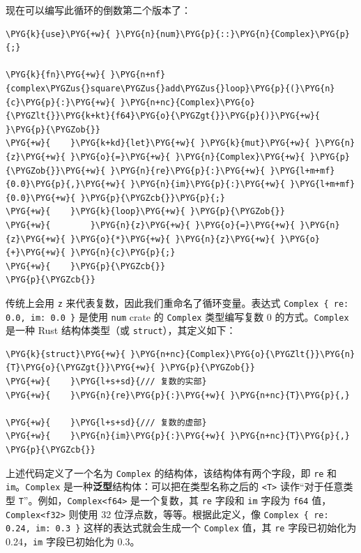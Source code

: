 现在可以编写此循环的倒数第二个版本了：

\begin{Verbatim}[commandchars=\\\{\},breaklines=true,breakanywhere=true,fontsize=\codefont,xleftmargin=17bp]
\PYG{k}{use}\PYG{+w}{ }\PYG{n}{num}\PYG{p}{::}\PYG{n}{Complex}\PYG{p}{;}

\PYG{k}{fn}\PYG{+w}{ }\PYG{n+nf}{complex\PYGZus{}square\PYGZus{}add\PYGZus{}loop}\PYG{p}{(}\PYG{n}{c}\PYG{p}{:}\PYG{+w}{ }\PYG{n+nc}{Complex}\PYG{o}{\PYGZlt{}}\PYG{k+kt}{f64}\PYG{o}{\PYGZgt{}}\PYG{p}{)}\PYG{+w}{ }\PYG{p}{\PYGZob{}}
\PYG{+w}{    }\PYG{k+kd}{let}\PYG{+w}{ }\PYG{k}{mut}\PYG{+w}{ }\PYG{n}{z}\PYG{+w}{ }\PYG{o}{=}\PYG{+w}{ }\PYG{n}{Complex}\PYG{+w}{ }\PYG{p}{\PYGZob{}}\PYG{+w}{ }\PYG{n}{re}\PYG{p}{:}\PYG{+w}{ }\PYG{l+m+mf}{0.0}\PYG{p}{,}\PYG{+w}{ }\PYG{n}{im}\PYG{p}{:}\PYG{+w}{ }\PYG{l+m+mf}{0.0}\PYG{+w}{ }\PYG{p}{\PYGZcb{}}\PYG{p}{;}
\PYG{+w}{    }\PYG{k}{loop}\PYG{+w}{ }\PYG{p}{\PYGZob{}}
\PYG{+w}{        }\PYG{n}{z}\PYG{+w}{ }\PYG{o}{=}\PYG{+w}{ }\PYG{n}{z}\PYG{+w}{ }\PYG{o}{*}\PYG{+w}{ }\PYG{n}{z}\PYG{+w}{ }\PYG{o}{+}\PYG{+w}{ }\PYG{n}{c}\PYG{p}{;}
\PYG{+w}{    }\PYG{p}{\PYGZcb{}}
\PYG{p}{\PYGZcb{}}
\end{Verbatim}

传统上会用 \texttt{z} 来代表复数，因此我们重命名了循环变量。表达式 \texttt{Complex \{ re: 0.0, im: 0.0 \}} 是使用 \texttt{num} crate 的 \texttt{Complex} 类型编写复数 0 的方式。\texttt{Complex} 是一种 Rust 结构体类型（或 \texttt{struct}），其定义如下：

\begin{Verbatim}[commandchars=\\\{\},breaklines=true,breakanywhere=true,fontsize=\codefont,xleftmargin=17bp]
\PYG{k}{struct}\PYG{+w}{ }\PYG{n+nc}{Complex}\PYG{o}{\PYGZlt{}}\PYG{n}{T}\PYG{o}{\PYGZgt{}}\PYG{+w}{ }\PYG{p}{\PYGZob{}}
\PYG{+w}{    }\PYG{l+s+sd}{/// 复数的实部}
\PYG{+w}{    }\PYG{n}{re}\PYG{p}{:}\PYG{+w}{ }\PYG{n+nc}{T}\PYG{p}{,}

\PYG{+w}{    }\PYG{l+s+sd}{/// 复数的虚部}
\PYG{+w}{    }\PYG{n}{im}\PYG{p}{:}\PYG{+w}{ }\PYG{n+nc}{T}\PYG{p}{,}
\PYG{p}{\PYGZcb{}}
\end{Verbatim}

上述代码定义了一个名为 \texttt{Complex} 的结构体，该结构体有两个字段，即 \texttt{re} 和 \texttt{im}。\texttt{Complex} 是一种\textbf{泛型}结构体：可以把在类型名称之后的 \texttt{<T>} 读作“对于任意类型 \texttt{T}”。例如，\texttt{Complex<f64>} 是一个复数，其 \texttt{re} 字段和 \texttt{im} 字段为 \texttt{f64} 值，\texttt{Complex<f32>} 则使用 32 位浮点数，等等。根据此定义，像 \texttt{Complex \{ re: 0.24, im: 0.3 \}} 这样的表达式就会生成一个 \texttt{Complex} 值，其 \texttt{re} 字段已初始化为 0.24，\texttt{im} 字段已初始化为 0.3。

